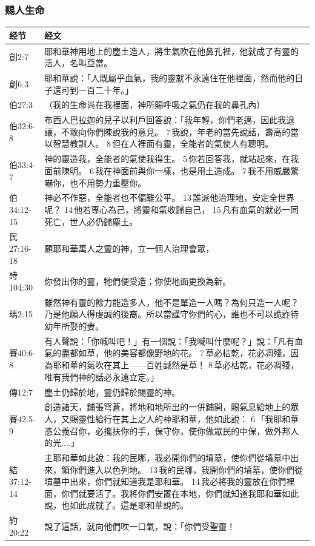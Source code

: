 \subsubsection{赐人生命}
\begin{table}[H]
\centering
\begin{tabular}{p{6em}p{40em}}  \toprule
经节&经文 \\  \midrule
創2:7&耶和華神用地上的塵土造人，將生氣吹在他鼻孔裡，他就成了有靈的活人，名叫亞當。\\  \midrule
創6:3&耶和華說：「人既屬乎血氣，我的靈就不永遠住在他裡面，然而他的日子還可到一百二十年。」\\  \midrule
伯27:3&（我的生命尚在我裡面，神所賜呼吸之氣仍在我的鼻孔內）\\  \midrule
伯32:6-8&布西人巴拉迦的兒子以利戶回答說：「我年輕，你們老邁，因此我退讓，不敢向你們陳說我的意見。 7 我說，年老的當先說話，壽高的當以智慧教訓人。 8 但在人裡面有靈，全能者的氣使人有聰明。\\  \midrule

伯33:4-7&神的靈造我，全能者的氣使我得生。 5 你若回答我，就站起來，在我面前陳明。 6 我在神面前與你一樣，也是用土造成。 7 我不用威嚴驚嚇你，也不用勢力重壓你。\\  \midrule
伯34:12-15&神必不作惡，全能者也不偏離公平。 13 誰派他治理地，安定全世界呢？ 14 他若專心為己，將靈和氣收歸自己， 15 凡有血氣的就必一同死亡，世人必仍歸塵土。\\  \midrule


民27:16-18&願耶和華萬人之靈的神，立一個人治理會眾，\\  \midrule
詩104:30&你發出你的靈，牠們便受造；你使地面更換為新。\\\bottomrule
瑪2:15&雖然神有靈的餘力能造多人，他不是單造一人嗎？為何只造一人呢？乃是他願人得虔誠的後裔。所以當謹守你們的心，誰也不可以詭詐待幼年所娶的妻。\\  \midrule
賽40:6-8&有人聲說：「你喊叫吧！」有一個說：「我喊叫什麼呢？」說：「凡有血氣的盡都如草，他的美容都像野地的花。 7 草必枯乾，花必凋殘，因為耶和華的氣吹在其上——百姓誠然是草！ 8 草必枯乾，花必凋殘，唯有我們神的話必永遠立定。」\\  \midrule
傳12:7&塵土仍歸於地，靈仍歸於賜靈的神。\\  \midrule
賽42:5-9&創造諸天，鋪張穹蒼，將地和地所出的一併鋪開，賜氣息給地上的眾人，又賜靈性給行在其上之人的神耶和華，他如此說： 6 「我耶和華憑公義召你，必攙扶你的手，保守你，使你做眾民的中保，做外邦人的光....」\\  \midrule

結37:12-14&主耶和華如此說：我的民哪，我必開你們的墳墓，使你們從墳墓中出來，領你們進入以色列地。 13 我的民哪，我開你們的墳墓，使你們從墳墓中出來，你們就知道我是耶和華。 14 我必將我的靈放在你們裡面，你們就要活了。我將你們安置在本地，你們就知道我耶和華如此說，也如此成就了。這是耶和華說的。\\  \midrule
約20:22&說了這話，就向他們吹一口氣，說：「你們受聖靈！
\\\bottomrule
\end{tabular}
\end{table}





